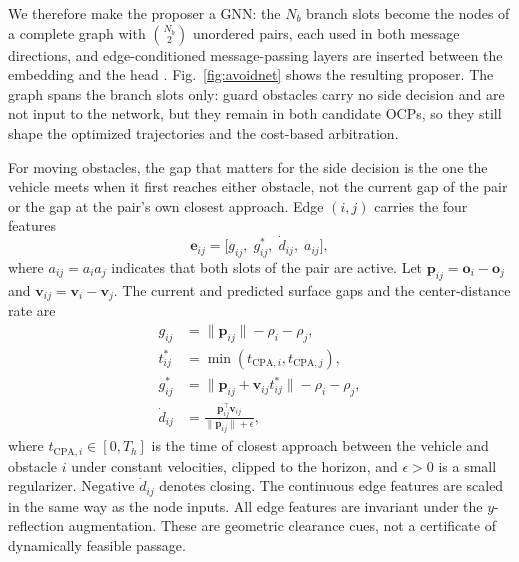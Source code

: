 \documentclass{article}
\theoremstyle{definition}
\begin{document}
We therefore make the proposer a GNN: the $N_b$ branch
slots become the nodes of a complete graph with
$\binom{N_b}{2}$ unordered pairs, each used in both message directions, and
edge-conditioned message-passing layers are inserted between the
embedding and the head \citep{gilmer2017neural,battaglia2018relational}.
Fig.~\ref{fig:avoidnet} shows the resulting proposer. The graph spans
the branch slots only: guard obstacles carry no side decision and are not
input to the network, but they remain in both candidate OCPs, so they still
shape the optimized trajectories and the cost-based arbitration.

For moving obstacles, the gap that matters for the side decision is the
one the vehicle meets when it first reaches either obstacle, not the current gap of the pair or the gap at the pair's own closest approach.
Edge $(i,j)$ carries the four features
\begin{equation}
\mathbf{e}_{ij}=\big[g_{ij},\;g^*_{ij},\;\dot d_{ij},\;a_{ij}\big],
\label{eq:edge}
\end{equation}
where $a_{ij}=a_ia_j$ indicates that both slots of the pair are
active. Let
$\mathbf{p}_{ij}=\mathbf{o}_i-\mathbf{o}_j$ and
$\mathbf{v}_{ij}=\mathbf{v}_i-\mathbf{v}_j$. The current and predicted surface
gaps and the center-distance rate are
\begin{equation}
\begin{aligned}
g_{ij}&=\lVert\mathbf{p}_{ij}\rVert-\rho_i-\rho_j,\\
t^*_{ij}&=\min(t_{\mathrm{CPA},i},t_{\mathrm{CPA},j}),\\
g^*_{ij}&=\lVert\mathbf{p}_{ij}+\mathbf{v}_{ij}t^*_{ij}\rVert-\rho_i-\rho_j,\\
\dot d_{ij}&=\frac{\mathbf{p}_{ij}^{\top}\mathbf{v}_{ij}}
{\lVert\mathbf{p}_{ij}\rVert+\epsilon},
\end{aligned}
\label{eq:edge_geometry}
\end{equation}
where $t_{\mathrm{CPA},i}\in[0,T_h]$ is the time of closest approach between the
vehicle and obstacle $i$ under constant velocities, clipped to the horizon, and
$\epsilon>0$ is a small regularizer.  Negative $\dot d_{ij}$
denotes closing. The continuous edge features are scaled in the same
way as the node inputs. All edge features are invariant under the
$y$-reflection augmentation. These are geometric clearance cues, not a
certificate of dynamically feasible passage.
\end{document}
